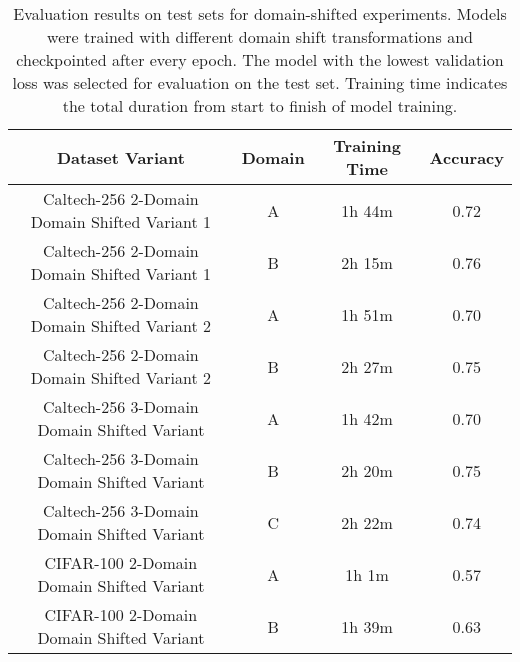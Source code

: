 \begin{table}[ht]
\centering
\caption{Evaluation results on test sets for domain-shifted experiments. Models were trained with different domain shift transformations and checkpointed after every epoch. The model with the lowest validation loss was selected for evaluation on the test set. Training time indicates the total duration from start to finish of model training.}
\label{tab:evaluation_results_domain_shifted}
\begin{tabular}{cccc}
\toprule
Dataset Variant & Domain & Training Time & Accuracy \\
\midrule
Caltech-256 2-Domain Domain Shifted Variant 1 & A & 1h 44m & 0.72 \\
Caltech-256 2-Domain Domain Shifted Variant 1 & B & 2h 15m & 0.76 \\
Caltech-256 2-Domain Domain Shifted Variant 2 & A & 1h 51m & 0.70 \\
Caltech-256 2-Domain Domain Shifted Variant 2 & B & 2h 27m & 0.75 \\
Caltech-256 3-Domain Domain Shifted Variant & A & 1h 42m & 0.70 \\
Caltech-256 3-Domain Domain Shifted Variant & B & 2h 20m & 0.75 \\
Caltech-256 3-Domain Domain Shifted Variant & C & 2h 22m & 0.74 \\
CIFAR-100 2-Domain Domain Shifted Variant & A & 1h 1m & 0.57 \\
CIFAR-100 2-Domain Domain Shifted Variant & B & 1h 39m & 0.63 \\
\bottomrule
\end{tabular}
\end{table}
